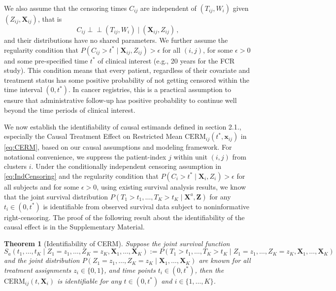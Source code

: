 \documentclass[aoas]{imsart}
\theoremstyle{plain}
\newtheorem{theorem}{Theorem}[section]
\theoremstyle{definition}
\begin{document}
We also assume that the censoring times $C_{ij}$ are independent of  $(T_{ij},W_i)$ given $(Z_{ij},\mathbf{X}_{ij})$, that is 
\begin{equation}
   C_{ij}\perp\!\!\!\perp (T_{ij}, W_i)  \mid   (\mathbf{X}_{ij},  Z_{ij}) 
   \hspace{2pt}, 
   \label{eq:IndCensoring}
   \end{equation}
and their distributions have no shared parameters. 
We further assume the regularity condition that $P(C_{ij} > t^* \mid \mathbf{X}_{ij}, Z_{ij}) > \epsilon $ for all $(i,j)$, for some $\epsilon > 0$ and some pre-specified time $t^*$ of clinical interest (e.g., 20 years for the FCR study). This condition means that every patient, regardless of their covariate and treatment status has  some positive probability of not getting censored within the time interval $(0, t^*)$. In cancer registries, this is a practical assumption to ensure that administrative follow-up has positive probability to continue well beyond the time periods of clinical interest. 

We now establish the identifiability of causal estimands defined in section 2.1., especially the Causal Treatment Effect on Restricted Mean $\text{CERM}_{ij}(t^*, \mathbf{x}_{ij})$ in \eqref{eq:CERM},  based on our causal assumptions and modeling framework.
For notational convenience, we suppress the patient-index $j$ within unit $(i,j)$ from clusters $i$.
Under the conditionally independent censoring assumption in  \eqref{eq:IndCensoring} and the regularity condition that $P(C_{i} > t^* \mid \mathbf{X}_{i}, Z_{i}) > \epsilon$ for all subjects and for some $\epsilon > 0$, using existing survival analysis results, we know that the joint survival distribution
$  
P(T_{1} > t_{1}, \ldots, T_{K} > t_{K} \mid \mathbf{X}^a, \mathbf{Z})
$
for any $t_{i} \in (0, t^*)$ is identifiable from observed survival data subject to noninformative right-censoring.
The proof of the following result about the identifiability of the causal effect is in the Supplementary Material.

\noindent \begin{theorem}[Identifiability of CERM]
Suppose the joint survival function
$
S_a(t_1, \ldots, t_K \mid Z_1 = z_1, \ldots, Z_K = z_K, \mathbf{X}_1, \ldots, \mathbf{X}_K) := P(T_1 > t_1, \ldots, T_K > t_K \mid Z_1 = z_1, \ldots, Z_K = z_K, \mathbf{X}_1, \ldots, \mathbf{X}_K)
$ and the joint distribution $P(Z_1 = z_1, \ldots, Z_K = z_K \mid \mathbf{X}_1, \ldots, \mathbf{X}_K)$
are known  for all treatment assignments $z_i \in \{0,1\}$, and time points $t_i \in (0, t^*)$, then the $\text{CERM}_{ij}(t, \mathbf{X}_i)$ is identifiable for any $t \in (0, t^*)$ and  $ i \in \{1,\dots,K\}$.
\end{theorem}
\end{document}
